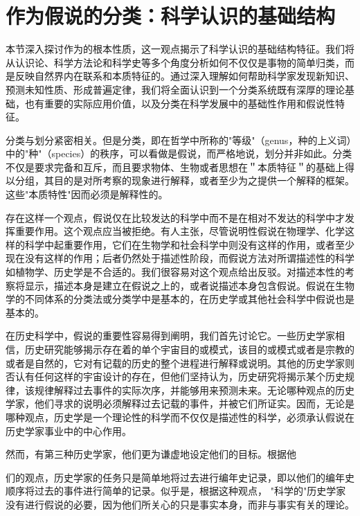 \section{作为假说的分类：科学认识的基础结构}

\begin{logicbox}[title=引言]
本节深入探讨作为的根本性质，这一观点揭示了科学认识的基础结构特征。我们将从认识论、科学方法论和科学史等多个角度分析如何不仅仅是事物的简单归类，而是反映自然界内在联系和本质特征的。通过深入理解如何帮助科学家发现新知识、预测未知性质、形成普遍定律，我们将全面认识到一个分类系统既有深厚的理论基础，也有重要的实际应用价值，以及分类在科学发展中的基础性作用和假说性特征。
\end{logicbox}

分类与划分紧密相关。但是分类，即在哲学中所称的"等级"（genus，种的上义词）中的"种"（species）的秩序，可以看做是假说，而严格地说，划分并非如此。分类不仅是要求完备和互斥，而且要求物体、生物或者思想在＂本质特征＂的基础上得以分组，其目的是对所考察的现象进行解释，或者至少为之提供一个解释的框架。这些"本质特性"因而必须是解释性的。

存在这样一个观点，假说仅在比较发达的科学中而不是在相对不发达的科学中才发挥重要作用。这个观点应当被拒绝。有人主张，尽管说明性假说在物理学、化学这样的科学中起重要作用，它们在生物学和社会科学中则没有这样的作用，或者至少现在没有这样的作用；后者仍然处于描述性阶段，而假说方法对所谓描述性的科学如植物学、历史学是不合适的。我们很容易对这个观点给出反驳。对描述本性的考察将显示，描述本身是建立在假说之上的，或者说描述本身包含假说。假说在生物学的不同体系的分类法或分类学中是基本的，在历史学或其他社会科学中假说也是基本的。

在历史科学中，假说的重要性容易得到阐明，我们首先讨论它。一些历史学家相信，历史研究能够揭示存在着的单个宇宙目的或模式，该目的或模式或者是宗教的或者是自然的，它对有记载的历史的整个进程进行解释或说明。其他的历史学家则否认有任何这样的宇宙设计的存在，但他们坚持认为，历史研究将揭示某个历史规律，该规律解释过去事件的实际次序，并能够用来预测未来。无论哪种观点的历史学家，他们寻求的说明必须解释过去记载的事件，并被它们所证实。因而，无论是哪种观点，历史学是一个理论性的科学而不仅仅是描述性的科学，必须承认假说在历史学家事业中的中心作用。

然而，有第三种历史学家，他们更为谦虚地设定他们的目标。根据他

们的观点，历史学家的任务只是简单地将过去进行编年史记录，即以他们的编年史顺序将过去的事件进行简单的记录。似乎是，根据这种观点， "科学的"历史学家没有进行假说的必要，因为他们所关心的只是事实本身，而非与事实有关的理论。

